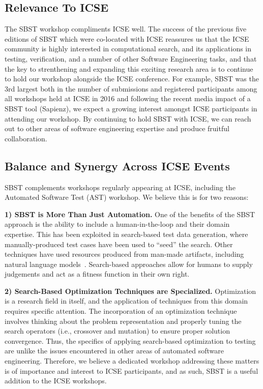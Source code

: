 \documentclass[10pt,conference]{IEEEtran}
\begin{document}
\subsection{Relevance To ICSE}
\label{sec:relevance-icse}

The SBST workshop compliments ICSE well. The success of the previous
five editions of SBST which were co-located with ICSE reassures us
that the ICSE community is highly interested in computational search,
and its applications in testing, verification, and a number of other
Software Engineering tasks, and that the key to strenthening and
expanding this exciting research area is to continue to hold our
workshop alongside the ICSE conference. For example, SBST was the 3rd
largest both in the number of submissions and registered participants
among all workshops held at ICSE in 2016 and following the recent
media impact of a SBST tool (Sapienz), we expect a growing interest
amongst ICSE participants in attending our workshop.  By continuing to
hold SBST with ICSE, we can reach out to other areas of software
engineering expertise and produce fruitful collaboration.


\subsection{Balance and Synergy Across ICSE Events}
\label{sec:balance-icse}

SBST complements workshops regularly appearing at ICSE, including the
Automated Software Test (AST) workshop.  We believe this is for two
reasons:

{\bf 1) SBST is More Than Just Automation.}  One of the benefits of
the SBST approach is the ability to include a human-in-the-loop and
their domain expertise.  This has been exploited in search-based test
data generation, where manually-produced test cases have been used to
``seed'' the search.  Other techniques have used resources produced
from man-made artifacts, including natural language
models~\cite{Afshan2013}.  Search-based approaches allow for humans to
supply judgements and act as a fitness function in their own
right. %

{\bf 2) Search-Based Optimization Techniques are Specialized.}
Optimization is a research field in itself, and the application of
techniques from this domain requires specific attention.  The
incorporation of an optimization technique involves thinking about the
problem representation and properly tuning the search operators (i.e.,
crossover and mutation) to ensure proper solution convergence.  Thus,
the specifics of applying search-based optimization to testing are
unlike the issues encountered in other areas of automated software
engineering. Therefore, we believe a dedicated workshop addressing
these matters is of importance and interest to ICSE participants, and
as such, SBST is a useful addition to the ICSE workshops.
\end{document}
